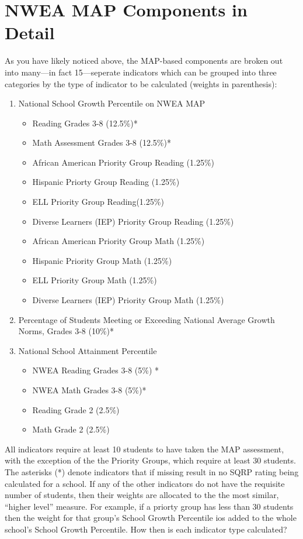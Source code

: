\documentclass[sfsidenotes, justified]{tufte-handout}\usepackage[]{graphicx}\usepackage[]{color}
\begin{document}
\section{NWEA MAP Components in Detail}
As you have likely noticed above, the MAP-based components are broken out into many---in fact 15---seperate indicators which can be grouped into three categories by the type of indicator to be calculated (weights in parenthesis):

\begin{enumerate}
  \item National School Growth Percentile on NWEA MAP
  \begin{itemize}
    \item Reading Grades 3-8 (12.5\%)*
    \item Math Assessment Grades 3-8 (12.5\%)*
    \item African American Priority Group Reading (1.25\%)
    \item Hispanic Priorty Group Reading (1.25\%)
    \item ELL Priority Group Reading(1.25\%)
    \item Diverse Learners (IEP) Priority Group  Reading (1.25\%)
    \item African American Priority Group Math (1.25\%)
    \item Hispanic Priority Group Math (1.25\%)
    \item ELL Priority Group Math (1.25\%)
    \item Diverse Learners (IEP) Priority Group Math (1.25\%)
  \end{itemize}
  \item Percentage of Students Meeting or Exceeding National Average Growth Norms, Grades 3-8 (10\%)*
  \item National School Attainment Percentile
  \begin{itemize} 
    \item NWEA Reading Grades 3-8 (5\%) *
    \item  NWEA Math Grades 3-8 (5\%)*
    \item Reading Grade 2 (2.5\%)
    \item  Math Grade 2 (2.5\%)
  \end{itemize}
\end{enumerate}

All indicators require at least 10 students to have taken the MAP assessment, with the exception of the the Priority Groups, which require at least 30 students. The asterisks (*) denote indicators that if missing result in no SQRP rating being calculated for a school.  If any of the other indicators do not have the requisite number of students, then their weights are allocated to the the most similar, ``higher level'' measure.  For example, if a priorty group has less than 30 students then the weight for that group's School Growth Percentile ios added to the whole school's School Growth Percentile. How then is each indicator type calculated?
\end{document}
